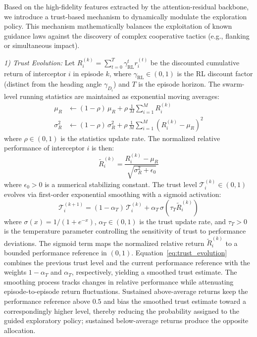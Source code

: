 \documentclass[lettersize,journal]{IEEEtran}
\begin{document}
Based on the high-fidelity features extracted by the attention-residual backbone, we introduce a trust-based mechanism to dynamically modulate the exploration policy. This mechanism mathematically balances the exploitation of known guidance laws against the discovery of complex cooperative tactics (e.g., flanking or simultaneous impact).

\emph{1) Trust Evolution:} Let $R_i^{(k)} = \sum_{t=0}^{T} \gamma_{\mathrm{RL}}^t r_i^{(t)}$ be the discounted cumulative return of interceptor $i$ in episode $k$, where $\gamma_{\mathrm{RL}} \in (0,1)$ is the RL discount factor (distinct from the heading angle $\gamma_{D_i}$) and $T$ is the episode horizon. The swarm-level running statistics are maintained as exponential moving averages:
\begin{align}
\mu_R &\leftarrow (1-\rho)\,\mu_R + \rho\,\frac{1}{M}\sum_{i=1}^{M} R_i^{(k)} \label{eq:running_stats_mu} \\
\sigma_R^2 &\leftarrow (1-\rho)\,\sigma_R^2 + \rho\,\frac{1}{M}\sum_{i=1}^{M}\!\left(R_i^{(k)} - \mu_R\right)^2 \label{eq:running_stats_sigma}
\end{align}
where $\rho \in (0,1)$ is the statistics update rate. The normalized relative performance of interceptor $i$ is then:
\begin{equation}
\label{eq:trust_normalized}
\tilde{R}_i^{(k)} = \frac{R_i^{(k)} - \mu_R}{\sqrt{\sigma_R^2 + \epsilon_0}}
\end{equation}
where $\epsilon_0 > 0$ is a numerical stabilizing constant. The trust level $\mathcal{T}_i^{(k)} \in (0,1)$ evolves via first-order exponential smoothing with a sigmoid activation:
\begin{equation}
\label{eq:trust_evolution}
\mathcal{T}_i^{(k+1)} = (1-\alpha_T)\,\mathcal{T}_i^{(k)} + \alpha_T\,\sigma\!\left(\tau_T \tilde{R}_i^{(k)}\right)
\end{equation}
where $\sigma(x)=1/(1+e^{-x})$, $\alpha_T\in(0,1)$ is the trust update rate,
and $\tau_T>0$ is the temperature parameter controlling the sensitivity of
trust to performance deviations.
The sigmoid term maps the normalized relative return
$\tilde{R}_i^{(k)}$ to a bounded performance reference in $(0,1)$.
Equation~\eqref{eq:trust_evolution} combines the previous trust level and
the current performance reference with the weights $1-\alpha_T$ and
$\alpha_T$, respectively, yielding a smoothed trust estimate. The
smoothing process tracks changes in relative performance while attenuating
episode-to-episode return fluctuations. Sustained above-average returns
keep the performance reference above $0.5$ and bias the smoothed trust
estimate toward a correspondingly higher level, thereby reducing the
probability assigned to the guided exploratory policy; sustained
below-average returns produce the opposite allocation.
\end{document}

